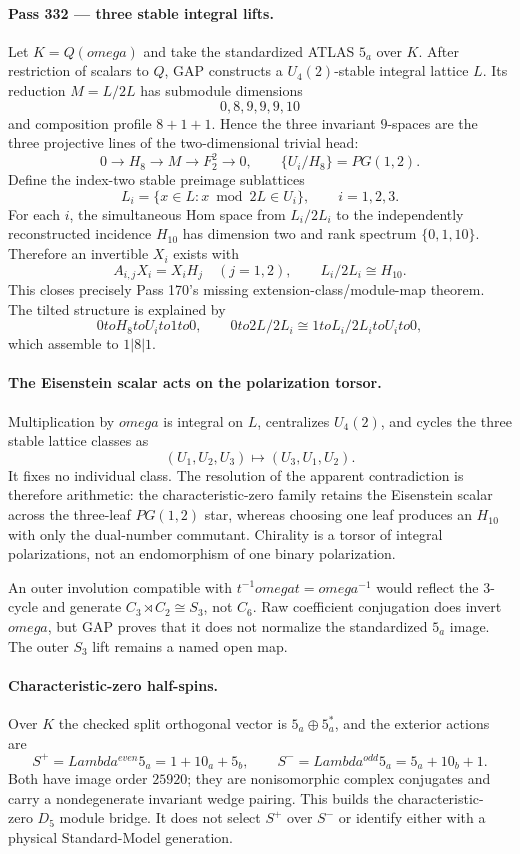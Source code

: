 \documentclass[12pt,a4paper]{article}
\def\mathbb#1{#1}%
\def\mathrm#1{#1}%
\def\omega{omega}%
\def\Lambda{Lambda}%
\def\to{ to }%
\theoremstyle{definition}
\newcommand{\PG}{\mathrm{PG}}
\newcommand{\FF}{\mathbb{F}}
\newcommand{\QQ}{\mathbb{Q}}
\begin{document}
\paragraph{Pass 332 --- three stable integral lifts.}
Let $K=\QQ(\omega)$ and take the standardized ATLAS $5_a$ over $K$. After
restriction of scalars to $\QQ$, GAP constructs a $U_4(2)$-stable integral
lattice $L$. Its reduction $M=L/2L$ has submodule dimensions
\[
 0,8,9,9,9,10
\]
and composition profile $8+1+1$. Hence the three invariant $9$-spaces are the
three projective lines of the two-dimensional trivial head:
\[
 0\longrightarrow H_8\longrightarrow M\longrightarrow\FF_2^2
 \longrightarrow0,
 \qquad \{U_i/H_8\}=\PG(1,2).
\]
Define the index-two stable preimage sublattices
\[
 L_i=\{x\in L:x\bmod2L\in U_i\},\qquad i=1,2,3.
\]
For each $i$, the simultaneous Hom space from $L_i/2L_i$ to the independently
reconstructed incidence $H_{10}$ has dimension two and rank spectrum
$\{0,1,10\}$. Therefore an invertible $X_i$ exists with
\[
 A_{i,j}X_i=X_iH_j\quad(j=1,2),
 \qquad
 \boxed{L_i/2L_i\cong H_{10}}.
\]
This closes precisely Pass 170's missing extension-class/module-map theorem.
The tilted structure is explained by
\[
 0\to H_8\to U_i\to1\to0,
 \qquad
 0\to2L/2L_i\cong1\to L_i/2L_i\to U_i\to0,
\]
which assemble to $1|8|1$.

\paragraph{The Eisenstein scalar acts on the polarization torsor.}
Multiplication by $\omega$ is integral on $L$, centralizes $U_4(2)$, and cycles
the three stable lattice classes as
\[
 (U_1,U_2,U_3)\longmapsto(U_3,U_1,U_2).
\]
It fixes no individual class. The resolution of the apparent contradiction is
therefore arithmetic: the characteristic-zero family retains the Eisenstein
scalar across the three-leaf $\PG(1,2)$ star, whereas choosing one leaf produces
an $H_{10}$ with only the dual-number commutant. Chirality is a torsor of
integral polarizations, not an endomorphism of one binary polarization.

An outer involution compatible with $t^{-1}\omega t=\omega^{-1}$ would reflect
the $3$-cycle and generate $C_3\rtimes C_2\cong S_3$, not $C_6$. Raw coefficient
conjugation does invert $\omega$, but GAP proves that it does not normalize the
standardized $5_a$ image. The outer $S_3$ lift remains a named open map.

\paragraph{Characteristic-zero half-spins.}
Over $K$ the checked split orthogonal vector is $5_a\oplus5_a^*$, and the
exterior actions are
\[
 S^+=\Lambda^{\mathrm{even}}5_a=1+10_a+5_b,
 \qquad
 S^-=\Lambda^{\mathrm{odd}}5_a=5_a+10_b+1.
\]
Both have image order $25920$; they are nonisomorphic complex conjugates and
carry a nondegenerate invariant wedge pairing. This builds the characteristic-
zero $D_5$ module bridge. It does not select $S^+$ over $S^-$ or identify either
with a physical Standard-Model generation.
\end{document}
